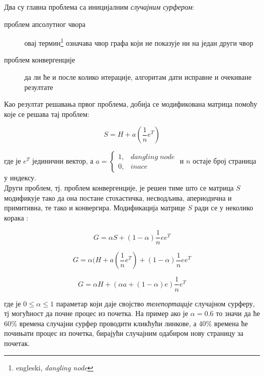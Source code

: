 Два су главна проблема са иницијалним \emph{случајним сурфером}:

\begin{description}
    \item[проблем апсолутног чвора] овај термин\footnote{engleski,
        \emph{dangling node}} означава чвор графа који не показује ни на један други чвор
\item[проблем конвергенције] да ли ће и после колико итерације, алгоритам дати исправне и очекиване резултате
\end{description}

Као резултат решавања првог проблема, добија се модификована матрица помоћу које
се решава тај проблем:

\begin{equation}
S = H + a(\frac{1}{n}e^{T})
\end{equation}

где је $e^T$ јединични вектор, а $a = \left\{\begin{matrix}
1, & dangling\; node \\
0, & inace
\end{matrix}\right.$ и $n$ остаје број страница у индексу.\\

Други проблем, тј. проблем конвергенције, је решен тиме што се матрица $S$
модификује тако да она постане стохастичка, несводљива, апериодична и
примитивна, те тако и конвергира. Модификација матрице $S$ ради се у неколико
корака \cite{langville2011google}:

\begin{equation}
G = \alpha S + (1-\alpha)\frac{1}{n}ee^{T}
\end{equation}

\begin{equation}
G = \alpha(H + a(\frac{1}{n}e^{T})+(1-\alpha)\frac{1}{n}ee^{T}
\end{equation}

\begin{equation}
G = \alpha H + (\alpha a + (1-\alpha)e)\frac{1}{n}e^{T}
\end{equation}

где је $0\leqslant\alpha\leqslant1$ параметар који даје својство \emph{телепортације} случајном сурферу, тј могућност да почне процес из почетка. На пример ако је $\alpha=0.6$ то значи да ће 60\% времена случајни сурфер проводити кликћући линкове, а 40\% времена ће почињати процес из почетка, бирајући случајним одабиром нову страницу за почетак.

